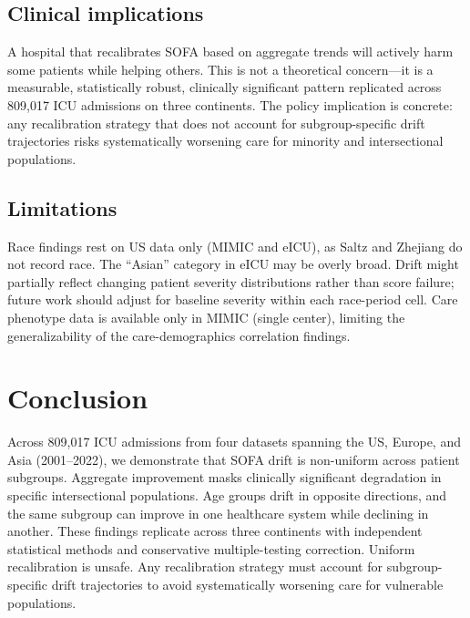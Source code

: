 \documentclass[pdflatex,sn-mathphys-num]{sn-jnl}
\theoremstyle{thmstyleone}%
\theoremstyle{thmstyletwo}%
\theoremstyle{thmstylethree}%
\begin{document}
\subsection{Clinical implications}\label{subsec:clinical}

A hospital that recalibrates SOFA based on aggregate trends will actively harm some patients while helping others. This is not a theoretical concern---it is a measurable, statistically robust, clinically significant pattern replicated across 809,017 ICU admissions on three continents. The policy implication is concrete: any recalibration strategy that does not account for subgroup-specific drift trajectories risks systematically worsening care for minority and intersectional populations.

\subsection{Limitations}\label{subsec:limitations}

Race findings rest on US data only (MIMIC and eICU), as Saltz and Zhejiang do not record race. The ``Asian'' category in eICU may be overly broad. Drift might partially reflect changing patient severity distributions rather than score failure; future work should adjust for baseline severity within each race-period cell. Care phenotype data is available only in MIMIC (single center), limiting the generalizability of the care-demographics correlation findings.

\section{Conclusion}\label{sec:conclusion}

Across 809,017 ICU admissions from four datasets spanning the US, Europe, and Asia (2001--2022), we demonstrate that SOFA drift is non-uniform across patient subgroups. Aggregate improvement masks clinically significant degradation in specific intersectional populations. Age groups drift in opposite directions, and the same subgroup can improve in one healthcare system while declining in another. These findings replicate across three continents with independent statistical methods and conservative multiple-testing correction. Uniform recalibration is unsafe. Any recalibration strategy must account for subgroup-specific drift trajectories to avoid systematically worsening care for vulnerable populations.
\end{document}
